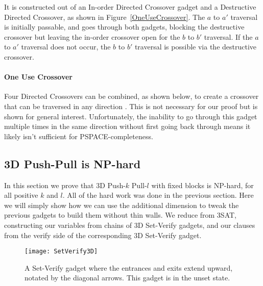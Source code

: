 It is constructed out of an In-order Directed Crossover gadget and a Destructive Directed Crossover, as shown in Figure~\ref{OneUseCrossover}. The $a$ to $a'$ traversal is initially passable, and goes through both gadgets,
blocking the destructive crossover but leaving the in-order crossover open for the $b$ to $b'$ traversal. If the $a$ to $a'$ traversal does not occur, the $b$ to $b'$ traversal is possible via the destructive crossover.

\paragraph{One Use Crossover} 
Four Directed Crossovers can be combined, as shown below, to create a crossover that can be traversed in any direction \cite{Push100}. This is not necessary for our proof but is shown for general interest. Unfortunately, the inability to go through this gadget multiple times in the same direction without first going back through means it likely isn't sufficient for PSPACE-completeness. 

\subsection{3D Push-Pull is NP-hard}
\label{3DNPhard}
In this section we prove that 3D Push-$k$ Pull-$l$ with fixed blocks is NP-hard, for all positive $k$ and $l$. All of the hard work was done in the previous section. Here we will simply show how we can use the additional dimension to tweak the previous gadgets to build them without thin walls. We reduce from 3SAT, constructing our variables from chains of 3D Set-Verify gadgets, and our clauses from the verify side of the corresponding 3D Set-Verify gadget.


\begin{wrapfigure}{r}{0.45\textwidth}
  \centering
    \texttt{[image: SetVerify3D]}
    \caption{A Set-Verify gadget where the entrances and exits extend upward, notated by the diagonal arrows. This gadget is in the unset state.}
    \label{3DSetVerify}
\end{wrapfigure}

